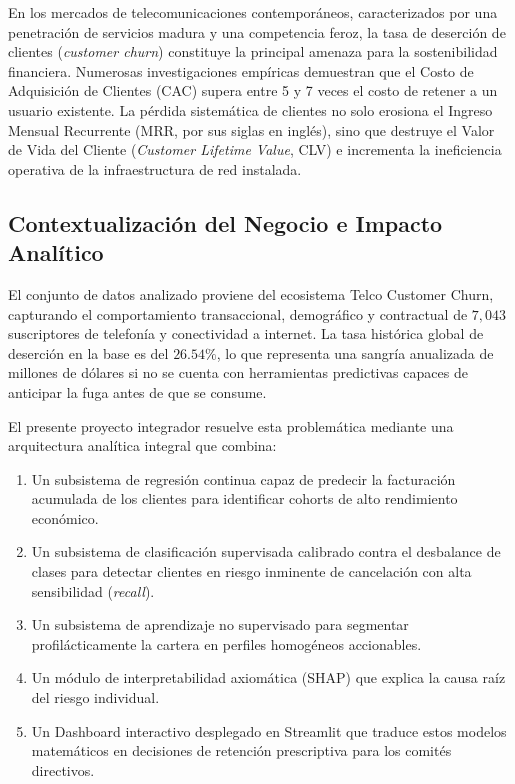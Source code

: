 \documentclass[11pt,letterpaper]{article}
\begin{document}
En los mercados de telecomunicaciones contemporáneos, caracterizados por una penetración de servicios madura y una competencia feroz, la tasa de deserción de clientes (\textit{customer churn}) constituye la principal amenaza para la sostenibilidad financiera. Numerosas investigaciones empíricas demuestran que el Costo de Adquisición de Clientes (CAC) supera entre 5 y 7 veces el costo de retener a un usuario existente. La pérdida sistemática de clientes no solo erosiona el Ingreso Mensual Recurrente (MRR, por sus siglas en inglés), sino que destruye el Valor de Vida del Cliente (\textit{Customer Lifetime Value}, CLV) e incrementa la ineficiencia operativa de la infraestructura de red instalada.

\subsection{Contextualización del Negocio e Impacto Analítico}
El conjunto de datos analizado proviene del ecosistema Telco Customer Churn, capturando el comportamiento transaccional, demográfico y contractual de $7{,}043$ suscriptores de telefonía y conectividad a internet. La tasa histórica global de deserción en la base es del $26.54\%$, lo que representa una sangría anualizada de millones de dólares si no se cuenta con herramientas predictivas capaces de anticipar la fuga antes de que se consume. 

El presente proyecto integrador resuelve esta problemática mediante una arquitectura analítica integral que combina:
\begin{enumerate}
    \item Un subsistema de regresión continua capaz de predecir la facturación acumulada de los clientes para identificar cohorts de alto rendimiento económico.
    \item Un subsistema de clasificación supervisada calibrado contra el desbalance de clases para detectar clientes en riesgo inminente de cancelación con alta sensibilidad (\textit{recall}).
    \item Un subsistema de aprendizaje no supervisado para segmentar profilácticamente la cartera en perfiles homogéneos accionables.
    \item Un módulo de interpretabilidad axiomática (SHAP) que explica la causa raíz del riesgo individual.
    \item Un Dashboard interactivo desplegado en Streamlit que traduce estos modelos matemáticos en decisiones de retención prescriptiva para los comités directivos.
\end{enumerate}
\end{document}
